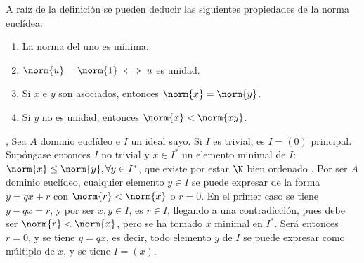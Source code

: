     \noindent A raíz de la definición se pueden deducir las siguientes propiedades de la norma euclídea:{\cite[p.~44]{Rosenberger}}
        \begin{enumerate}[label=\roman*)]
            \item La norma del uno es mínima.
            
            \item $\norm{u} = \norm{1} \iff u$ es unidad.
                
            \item Si $x$ e $y$ son asociados, entonces $\norm{x} = \norm{y}$.
        
            \item Si $y$ no es unidad, entonces $\norm{x} < \norm{xy}$.
        \end{enumerate}

        

\begin{prop}[Un DE es un DIP.]\label{resultado:op_cocientes}\end{prop}

\begin{dem}{\cite[p.~38]{GamboaAnillos}, \cite[p.~45]{Rosenberger}}
      Sea $A$ dominio euclídeo e $I$ un ideal suyo. Si $I$ es trivial, es $I = (0)$ principal. Supóngase entonces $I$ no trivial y $x\in I^*$ un elemento minimal de $I$: $\norm{x}\leq \norm{y},\forall y\in I^*$, que existe por estar $\N$ bien ordenado \cite[p.~89]{LenguajePineda}. Por ser $A$ dominio euclídeo, cualquier elemento $y\in I$ se puede expresar de la forma $y = qx + r$ con $\norm{r} < \norm{x}$ o $r = 0$. En el primer caso se tiene $y-qx = r$, y por ser $x,y\in I$, es $r\in I$, llegando a una contradicción, pues debe ser $\norm{r} < \norm{x}$, pero se ha tomado $x$ minimal en $I^*$. Será entonces $r = 0$, y se tiene $y=qx$, es decir, todo elemento $y$ de $I$ se puede expresar como múltiplo de $x$, y se tiene $I = (x)$.
\end{dem}

